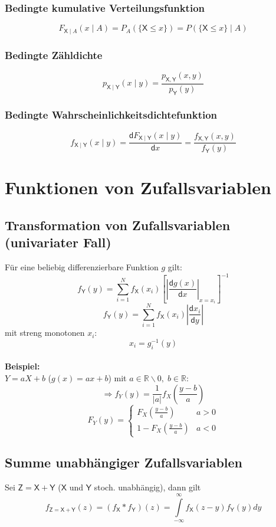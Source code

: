 \documentclass[a4paper,twocolumn,10pt]{article}
\begin{document}
\subsubsection{Bedingte kumulative Verteilungsfunktion}
\[F_{\mathsf X \mid A}(x \mid A) = P_A(\{\mathsf X \leq x\}) = P(\{\mathsf X \leq x\} \mid A)\]

\subsubsection{Bedingte Zähldichte}
\[p_{\mathsf X \mid \mathsf Y}(x \mid y) = \frac{p_{\mathsf X, \mathsf Y}(x,y)}{p_\mathsf Y(y)}\]

\subsubsection{Bedingte Wahrscheinlichkeitsdichtefunktion}
\[f_{\mathsf X \mid \mathsf Y}(x \mid y) = \frac{\mathsf dF_{\mathsf X \mid \mathsf Y}(x \mid y)}{\mathsf dx} = \frac{f_{\mathsf X, \mathsf Y}(x,y)}{f_\mathsf Y(y)}\]

\section{Funktionen von Zufallsvariablen}

\subsection{Transformation von Zufallsvariablen (univariater Fall)}
Für eine beliebig differenzierbare Funktion $g$ gilt:
\[f_\mathsf Y(y) = \sum_{i=1}^{N}f_\mathsf X(x_i) \left[\left|\frac{\mathsf dg(x)}{\mathsf dx}\right|_{x=x_i}\right]^{-1}\]
\[f_\mathsf Y(y) = \sum_{i=1}^{N}f_\mathsf X(x_i)\left|\frac{\mathsf dx_i}{\mathsf dy}\right|\]
mit streng monotonen $x_i$:
\[x_i=g_i^{-1}(y)\]\\
\textbf{Beispiel:}\\
$Y=aX+b$ ($g(x)=ax+b$) mit $a\in\mathbb{R}\backslash 0,\;b\in\mathbb{R}$:
\[\Rightarrow f_Y(y)=\frac{1}{|a|}f_X\left(\frac{y-b}{a}\right)\]
\[F_Y(y)=\begin{cases}F_X\left(\frac{y-b}{a}\right) & a>0 \\ 1-F_X\left(\frac{y-b}{a}\right) & a<0\end{cases}\]

\subsection{Summe unabhängiger Zufallsvariablen}
Sei $\mathsf Z = \mathsf X + \mathsf Y$ ($\mathsf X$ und $\mathsf Y$ stoch. unabhängig), dann gilt
\[f_{\mathsf Z = \mathsf X + \mathsf Y}(z) = (f_\mathsf X * f_\mathsf Y)(z)=\int\limits_{-\infty}^{\infty}f_{\mathsf{X}}(z-y)f_{\mathsf{Y}}(y)dy\]
\end{document}
